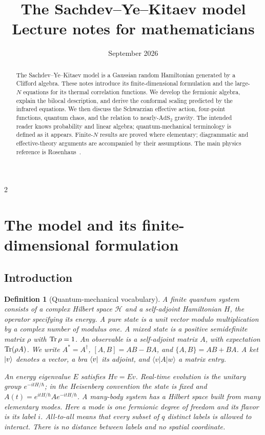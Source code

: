 \documentclass[11pt]{article}
\title{The Sachdev--Ye--Kitaev model\\[0.3em]
\large Lecture notes for mathematicians}
\author{}
\date{September 2026}
\numberwithin{equation}{section}
\theoremstyle{exposition}
\newtheorem{definition}{Definition}[section]
\theoremstyle{result}
\newcommand{\AdS}{\mathrm{AdS}}
\begin{document}
\maketitle

\begin{abstract}
The Sachdev--Ye--Kitaev model is a Gaussian random Hamiltonian generated by a Clifford algebra. These notes introduce its finite-dimensional formulation and the large-$N$ equations for its thermal correlation functions. We develop the fermionic algebra, explain the bilocal description, and derive the conformal scaling predicted by the infrared equations. We then discuss the Schwarzian effective action, four-point functions, quantum chaos, and the relation to nearly-$\AdS_2$ gravity. The intended reader knows probability and linear algebra; quantum-mechanical terminology is defined as it appears. Finite-$N$ results are proved where elementary; diagrammatic and effective-theory arguments are accompanied by their assumptions. The main physics reference is Rosenhaus~\cite{Rosenhaus}.
\end{abstract}

\begin{multicols}{2}
\small
\tableofcontents
\end{multicols}
\newpage

\section[The finite-dimensional model]{The model and its finite-dimensional formulation}\label{sec:foundations}

\subsection{Introduction}


\begin{definition}[Quantum-mechanical vocabulary]
A finite quantum system consists of a complex Hilbert space $\mathcal H$ and a self-adjoint Hamiltonian $H$, the operator specifying its energy. A pure state is a unit vector modulo multiplication by a complex number of modulus one. A mixed state is a positive semidefinite matrix $\rho$ with $\Tr\rho=1$. An observable is a self-adjoint matrix $A$, with expectation $\Tr(\rho A)$. We write $A^*=A^\dagger$, $[A,B]=AB-BA$, and $\{A,B\}=AB+BA$. A ket $\ket v$ denotes a vector, a bra $\bra v$ its adjoint, and $\langle v|A|w\rangle$ a matrix entry.

An energy eigenvalue $E$ satisfies $Hv=Ev$. Real-time evolution is the unitary group $e^{-itH/\hbar}$; in the Heisenberg convention the state is fixed and $A(t)=e^{itH/\hbar}Ae^{-itH/\hbar}$. A many-body system has a Hilbert space built from many elementary modes. Here a mode is one fermionic degree of freedom and its flavor is its label $i$. All-to-all means that every subset of $q$ distinct labels is allowed to interact. There is no distance between labels and no spatial coordinate.
\end{definition}
\end{document}
